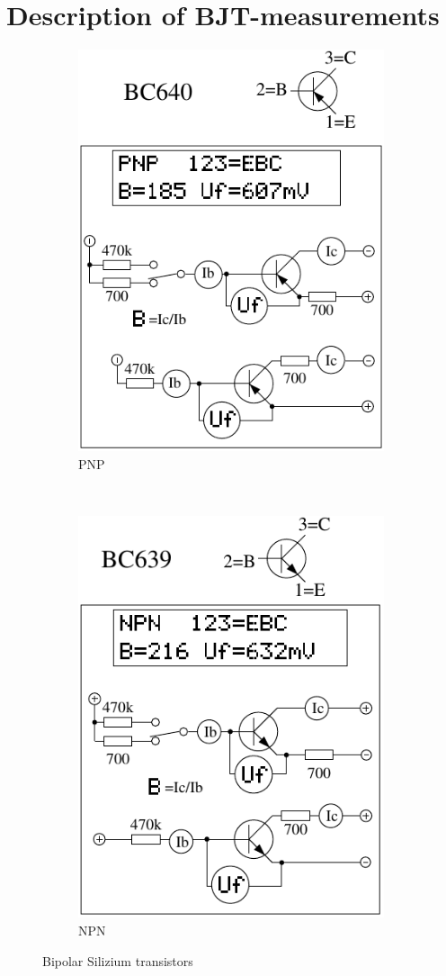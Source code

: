 \chapter{Description of BJT-measurements}
\label{sec:BJTmeasurements}

\begin{figure}[H]
  \begin{subfigure}[b]{9cm}
    \centering
    \includegraphics[width=9cm]{../FIG/BJT_BC640.pdf}
    \caption{PNP}
    \label{fig:BJT-PNP}
  \end{subfigure}
  ~
  \begin{subfigure}[b]{9cm}
    \centering
    \includegraphics[width=9cm]{../FIG/BJT_BC639.pdf}
    \caption{NPN}
    \label{fig:BJT-NPN}
  \end{subfigure}
  \caption{Bipolar Silizium transistors}
\end{figure}



